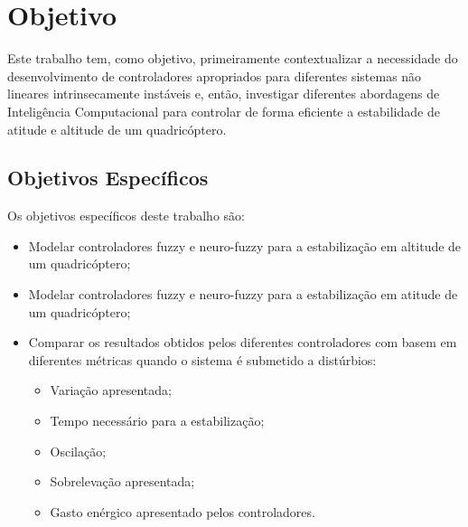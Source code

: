 \section{Objetivo}
\label{sec:introducao-objetivos-gerais}

Este trabalho tem, como objetivo, primeiramente contextualizar a necessidade do desenvolvimento de controladores apropriados para diferentes sistemas não lineares intrinsecamente instáveis e, então, investigar diferentes abordagens de Inteligência Computacional para controlar de forma eficiente a estabilidade de atitude e altitude de um quadricóptero.

\subsection{Objetivos Específicos}
\label{subsec:introducao-objetivos-específicos}

Os objetivos específicos deste trabalho são:
\begin{itemize}
\item Modelar controladores fuzzy e neuro-fuzzy para a estabilização em altitude de um quadricóptero;
\item Modelar controladores fuzzy e neuro-fuzzy para a estabilização em atitude de um quadricóptero;
\item Comparar os resultados obtidos pelos diferentes controladores com basem em diferentes métricas quando o sistema é submetido a distúrbios:
\begin{itemize}
	\item Variação apresentada;
	\item Tempo necessário para a estabilização;
	\item Oscilação;
	\item Sobrelevação apresentada;
	\item Gasto enérgico apresentado pelos controladores.
\end{itemize}
\end{itemize}

